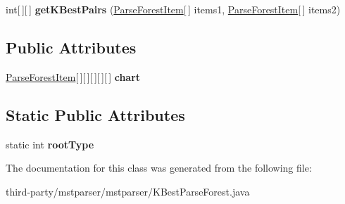 \begin{DoxyCompactItemize}
\item 
\hypertarget{classmstparser_1_1KBestParseForest_a5acd38a4f2fc07d74e8f6daff4d430ba}{
int\mbox{[}$\,$\mbox{]}\mbox{[}$\,$\mbox{]} {\bfseries getKBestPairs} (\hyperlink{classmstparser_1_1ParseForestItem}{ParseForestItem}\mbox{[}$\,$\mbox{]} items1, \hyperlink{classmstparser_1_1ParseForestItem}{ParseForestItem}\mbox{[}$\,$\mbox{]} items2)}
\label{classmstparser_1_1KBestParseForest_a5acd38a4f2fc07d74e8f6daff4d430ba}

\end{DoxyCompactItemize}
\subsection*{Public Attributes}
\begin{DoxyCompactItemize}
\item 
\hypertarget{classmstparser_1_1KBestParseForest_acf13a6481b007292e95accec7154a992}{
\hyperlink{classmstparser_1_1ParseForestItem}{ParseForestItem}\mbox{[}$\,$\mbox{]}\mbox{[}$\,$\mbox{]}\mbox{[}$\,$\mbox{]}\mbox{[}$\,$\mbox{]}\mbox{[}$\,$\mbox{]} {\bfseries chart}}
\label{classmstparser_1_1KBestParseForest_acf13a6481b007292e95accec7154a992}

\end{DoxyCompactItemize}
\subsection*{Static Public Attributes}
\begin{DoxyCompactItemize}
\item 
\hypertarget{classmstparser_1_1KBestParseForest_aa7a77fe225d2c67f9026df046c72e4e4}{
static int {\bfseries rootType}}
\label{classmstparser_1_1KBestParseForest_aa7a77fe225d2c67f9026df046c72e4e4}

\end{DoxyCompactItemize}


The documentation for this class was generated from the following file:\begin{DoxyCompactItemize}
\item 
third-\/party/mstparser/mstparser/KBestParseForest.java\end{DoxyCompactItemize}
